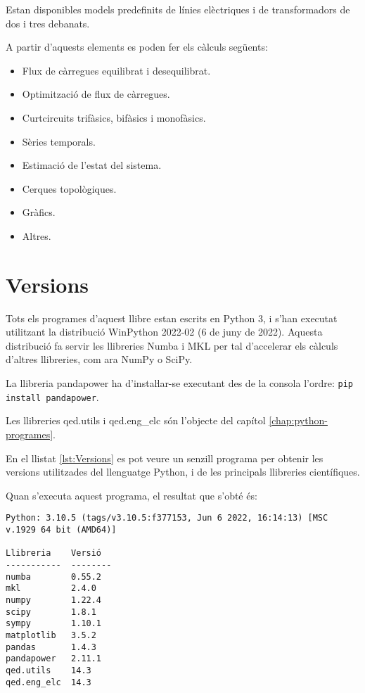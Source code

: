 Estan disponibles models predefinits de línies elèctriques i de transformadors de dos i tres debanats.

A partir d'aquests elements  es poden fer els càlculs següents:
\begin{itemize}
	\item Flux de càrregues equilibrat i desequilibrat.
	\item Optimització de flux de càrregues.
	\item Curtcircuits trifàsics, bifàsics i monofàsics.
	\item Sèries temporals.
	\item Estimació de l'estat del sistema.
	\item Cerques topològiques.
	\item Gràfics.
	\item Altres.
\end{itemize}


\section{Versions}\label{sec:python-versions}

Tots els programes d'aquest llibre estan escrits en Python 3, i s'han executat utilitzant la distribució WinPython 2022-02 (6 de juny de 2022). Aquesta distribució fa servir les llibreries Numba i MKL per tal d'accelerar els càlculs d'altres llibreries, com ara NumPy o SciPy.

La llibreria pandapower ha d'instaŀlar-se executant des de la consola  l'ordre: \texttt{pip install pandapower}.

Les llibreries qed.utils i qed.eng\_elc són l'objecte del capítol \ref{chap:python-programes}. 

En el llistat \vref{lst:Versions} es pot veure un senzill programa per obtenir les versions utilitzades  del llenguatge Python, i de les  principals llibreries científiques.


Quan s'executa aquest programa, el resultat que s'obté és:
\lstset{
	language=,
	numbers=none,
	frame=none
}

\begin{lstlisting}
Python: 3.10.5 (tags/v3.10.5:f377153, Jun 6 2022, 16:14:13) [MSC v.1929 64 bit (AMD64)] 

Llibreria    Versió
-----------  --------
numba        0.55.2
mkl          2.4.0
numpy        1.22.4
scipy        1.8.1
sympy        1.10.1
matplotlib   3.5.2
pandas       1.4.3
pandapower   2.11.1
qed.utils    14.3
qed.eng_elc  14.3
\end{lstlisting} 

